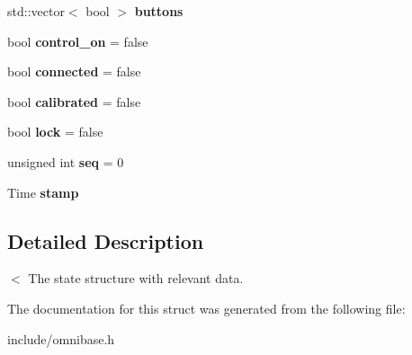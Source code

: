 \begin{DoxyCompactItemize}
\item 
\hypertarget{structOmniBase_1_1OmniState_aea00ff31f8584c954fe9d2b2c8a40bfd}{std\-::vector$<$ bool $>$ {\bfseries buttons}}\label{structOmniBase_1_1OmniState_aea00ff31f8584c954fe9d2b2c8a40bfd}

\item 
\hypertarget{structOmniBase_1_1OmniState_aeffa89b85058372bcc88db187e57a54d}{bool {\bfseries control\-\_\-on} = false}\label{structOmniBase_1_1OmniState_aeffa89b85058372bcc88db187e57a54d}

\item 
\hypertarget{structOmniBase_1_1OmniState_a45c2268fd93541ac30131e7da1512b37}{bool {\bfseries connected} = false}\label{structOmniBase_1_1OmniState_a45c2268fd93541ac30131e7da1512b37}

\item 
\hypertarget{structOmniBase_1_1OmniState_ad7fc57109bf1818ba1c5dc49781e7be0}{bool {\bfseries calibrated} = false}\label{structOmniBase_1_1OmniState_ad7fc57109bf1818ba1c5dc49781e7be0}

\item 
\hypertarget{structOmniBase_1_1OmniState_a2a748138ecea2bad3bd33d3071b4672f}{bool {\bfseries lock} = false}\label{structOmniBase_1_1OmniState_a2a748138ecea2bad3bd33d3071b4672f}

\item 
\hypertarget{structOmniBase_1_1OmniState_a81f179eb92a44ffaf3a37c73b4db2f73}{unsigned int {\bfseries seq} = 0}\label{structOmniBase_1_1OmniState_a81f179eb92a44ffaf3a37c73b4db2f73}

\item 
\hypertarget{structOmniBase_1_1OmniState_ad8a9749979d185fcb3616636cf7756ed}{Time {\bfseries stamp}}\label{structOmniBase_1_1OmniState_ad8a9749979d185fcb3616636cf7756ed}

\end{DoxyCompactItemize}


\subsection{Detailed Description}
$<$ The state structure with relevant data. 

The documentation for this struct was generated from the following file\-:\begin{DoxyCompactItemize}
\item 
include/omnibase.\-h\end{DoxyCompactItemize}
